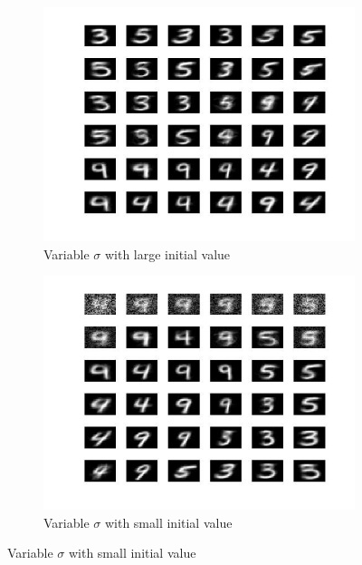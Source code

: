 \documentclass[a4paper, 12pt]{article}
\begin{document}
\begin{figure}[h]
  \begin{minipage}[c]{0.45\textwidth}
    \begin{figure}[H]
      \centering
      \includegraphics[scale=0.4]{../figure/sigmaLarge.jpg}
      \caption{Variable $\sigma$ with large initial value}
    \end{figure}
  \end{minipage}%
  \hspace{0.5cm}
  \begin{minipage}[c]{0.45\textwidth}
    \begin{figure}[H]
      \centering
      \includegraphics[scale=0.4]{../figure/sigmaSmall.jpg}
      \caption{Variable $\sigma$ with small initial value}
    \end{figure}
  \end{minipage}
\end{figure}
\end{document}
